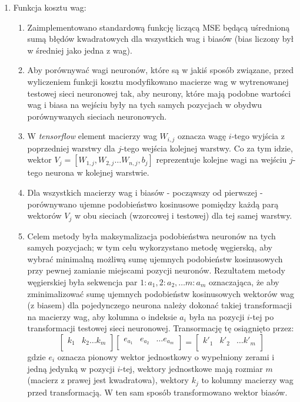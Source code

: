 \documentclass[12pt]{article}
\begin{document}
\begin{enumerate}
	
	\item \label{tit:cost} Funkcja kosztu wag:
	\begin{enumerate}
		\item Zaimplementowano standardową funkcję liczącą MSE będącą uśrednioną sumą błędów kwadratowych dla wszystkich wag i biasów (bias liczony był w średniej jako jedna z wag).
		\item Aby porównywać wagi neuronów, które są w jakiś sposób związane, przed wyliczeniem funkcji kosztu modyfikowano macierze wag w wytrenowanej testowej sieci neuronowej tak, aby neurony, które mają podobne wartości wag i biasa na wejściu były na tych samych pozycjach w obydwu porównywanych sieciach neuronowych.
		\item W \textit{tensorflow} element macierzy wag $W_{i,j}$ oznacza wagę $i$-tego wyjścia z poprzedniej warstwy dla $j$-tego wejścia kolejnej warstwy. Co za tym idzie, wektor $V_j=[W_{1,j}, W_{2,j} \dots W_{n,j}, b_j]$ reprezentuje kolejne wagi na wejściu $j$-tego neurona w kolejnej warstwie.
		\item Dla wszystkich macierzy wag i biasów - począwszy od pierwszej - porównywano ujemne podobieństwo kosinusowe pomiędzy każdą parą wektorów $V_j$ w obu sieciach (wzorcowej i testowej) dla tej samej warstwy.
		\item Celem metody była maksymalizacja podobieństwa neuronów na tych samych pozycjach; w tym celu wykorzystano metodę węgierską, aby wybrać minimalną możliwą sumę ujemnych podobieństw kosinusowych przy pewnej zamianie miejscami pozycji neuronów. Rezultatem metody węgierskiej była sekwencja par $1:a_1, 2:a_2, \dots m:a_m$ oznaczająca, że aby zminimalizować sumę ujemnych podobieństw kosinusowych wektorów wag (z biasem) dla pojedynczego neurona należy dokonać takiej transformacji na macierzy wag, aby kolumna o indeksie $a_i$ była na pozycji \(i\)-tej po transformacji testowej sieci neuronowej. Transormację tę osiągnięto przez:
		$$\begin{bmatrix}
			k_1 & k_2 \dots k_m\\
		\end{bmatrix}
		\begin{bmatrix}
			e_{a_1} & e_{a_2} & \dots e_{a_m}\\
		\end{bmatrix}
		=
		\begin{bmatrix}
			k'_1 & k'_2 & \dots k'_m\\
		\end{bmatrix}
		$$
		gdzie \(e_i\) oznacza pionowy wektor jednostkowy o wypełniony zerami i jedną jedynką w pozycji \(i\)-tej, wektory jednostkowe mają rozmiar \(m\) (macierz z prawej jest kwadratowa), wektory \(k_j\) to kolumny macierzy wag przed transformacją. W ten sam sposób transformowano wektor biasów.

\end{enumerate}
\end{enumerate}
\end{document}
